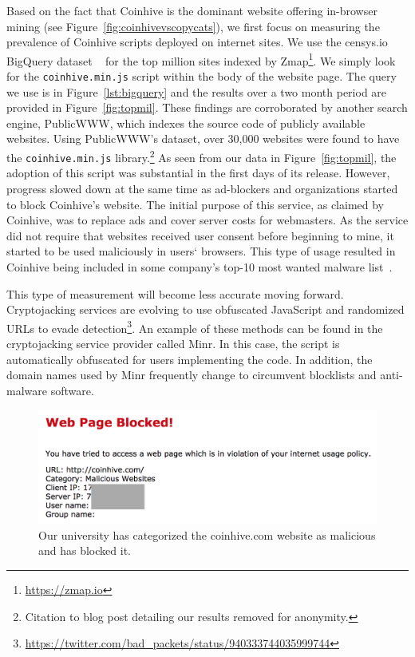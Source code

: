 Based on the fact that Coinhive is the dominant website offering in-browser mining  (see Figure~\ref{fig:coinhivevscopycats}), we first focus on measuring the prevalence of Coinhive scripts deployed on internet sites. We use the censys.io BigQuery dataset ~\cite{censys15} for the top million sites indexed by Zmap\footnote{\url{https://zmap.io}}. We simply look for the \texttt{coinhive.min.js} script within the body of the website page. The query we use is in Figure~\ref{lst:bigquery} and the results over a two month period are provided in Figure~\ref{fig:topmil}. These findings are corroborated by another search engine, PublicWWW, which indexes the source code of publicly available websites. Using PublicWWW's dataset, over 30,000 websites were found to have the \texttt{coinhive.min.js} library.\footnote{Citation to blog post detailing our results removed for anonymity.} As seen from our data in Figure~\ref{fig:topmil}, the adoption of this script was substantial in the first days of its release. However, progress slowed down at the same time as ad-blockers and organizations started to block Coinhive's website. The initial purpose of this service, as claimed by Coinhive, was to replace ads and cover server costs for webmasters. As the service did not require that websites received user consent before beginning to mine, it started to be used maliciously in users` browsers. This type of usage resulted in Coinhive being included in some company's top-10 most wanted malware list~\cite{checkpoint}.


This type of measurement will become less accurate moving forward. Cryptojacking services are evolving to use obfuscated JavaScript and randomized URLs to evade detection\footnote{\url{https://twitter.com/bad_packets/status/940333744035999744}}. An example of these methods can be found in the cryptojacking service provider called Minr. In this case, the script is automatically obfuscated for users implementing the code. In addition, the domain names used by Minr frequently change to circumvent blocklists and anti-malware software.

\begin{figure}[t]
\centering
\includegraphics[width=0.9\linewidth]{figures/coinhive_blocked.png}
\caption{Our university has categorized the coinhive.com website as malicious and has blocked it.\label{fig:concordia}}
\end{figure}

